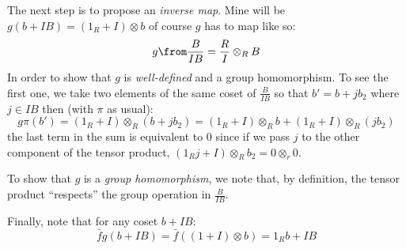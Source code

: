 \begin{description}
\begin{enumerate}[(a)]
            The next step is to propose an \emph{inverse map}. Mine will be $g(b+IB) = (1_R+I)\otimes b$ of course $g$ has to map like so:
            $$g\from \frac B{IB} = \frac RI\otimes_R B$$
            In order to show that $g$ is \emph{well-defined} and a group homomorphism. To see the first one, we take two elements of the same coset of $\frac B{IB}$ so that $b'=b+jb_2$ where $j\in IB$ then (with $\pi$ as usual):
            $$g\pi(b') = (1_R+I)\otimes_R (b+jb_2) = (1_R+I)\otimes_R b +(1_R+I)\otimes_R(jb_2)$$
            the last term in the sum is equivalent to 0 since if we pass $j$ to the other component of the tensor product, $(1_Rj+I)\otimes_R b_2=0\otimes_r 0$.

            To show that $g$ is a \emph{group homomorphism}, we note that, by definition, the tensor product ``respects'' the group operation in $\frac B{IB}$.

            Finally, note that for any coset $b+IB$:
            $$\bar f g(b+IB)=\bar f((1+I)\otimes b)= 1_Rb+IB$$
    \end{enumerate}
\end{description}
